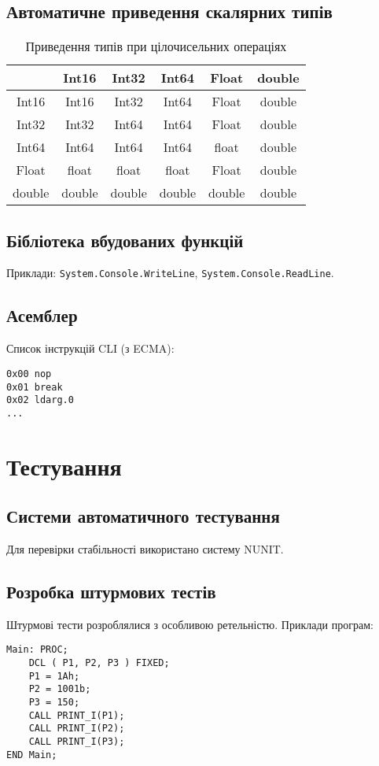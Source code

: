 \documentclass{memoir}
\begin{document}
\section{Автоматичне приведення скалярних типів}
\begin{table}[h]
    \centering
    \caption{Приведення типів при цілочисельних операціях}
    \begin{tabular}{|c|c|c|c|c|c|}
        \hline
        & Int16 & Int32 & Int64 & Float & double \\
        \hline
        Int16 & Int16 & Int32 & Int64 & Float & double \\
        Int32 & Int32 & Int64 & Int64 & Float & double \\
        Int64 & Int64 & Int64 & Int64 & float & double \\
        Float & float & float & float & Float & double \\
        double & double & double & double & double & double \\
        \hline
    \end{tabular}
\end{table}

\section{Бібліотека вбудованих функцій}
Приклади: \texttt{System.Console.WriteLine}, \texttt{System.Console.ReadLine}.

\section{Асемблер}
Список інструкцій CLI (з ECMA):
\begin{lstlisting}
0x00 nop
0x01 break
0x02 ldarg.0
...
\end{lstlisting}

\chapter{Тестування}
\section{Системи автоматичного тестування}
Для перевірки стабільності використано систему NUNIT.

\section{Розробка штурмових тестів}
Штурмові тести розроблялися з особливою ретельністю. Приклади програм:
\begin{lstlisting}
Main: PROC;
    DCL ( P1, P2, P3 ) FIXED;
    P1 = 1Ah;
    P2 = 1001b;
    P3 = 150;
    CALL PRINT_I(P1);
    CALL PRINT_I(P2);
    CALL PRINT_I(P3);
END Main;
\end{lstlisting}
\end{document}
